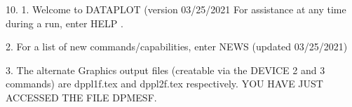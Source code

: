 10.
1. Welcome to DATAPLOT (version 03/25/2021  For assistance at
   any time during a run, enter HELP   .

2. For a list of new commands/capabilities,
   enter NEWS  (updated 03/25/2021)

3. The alternate Graphics output files (creatable
   via the DEVICE 2 and 3 commands) are
   dppl1f.tex and dppl2f.tex respectively.
YOU HAVE JUST ACCESSED THE FILE DPMESF.
